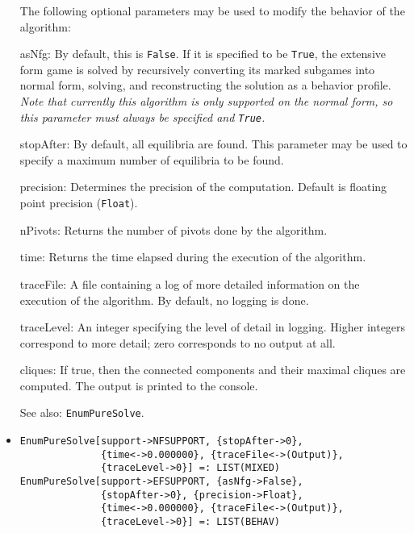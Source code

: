 \begin{itemize}
The following optional parameters may be used to modify the behavior
of the algorithm:
\bd
\item
[asNfg:] By default, this is \verb+False+.  If it is specified to be
\verb+True+, the extensive form game is solved by recursively converting
its marked subgames into normal form, solving, and reconstructing the
solution as a behavior profile.  {\it Note that currently this algorithm
is only supported on the normal form, so this parameter
must always be specified and {\tt True}.} 
\item
[stopAfter:] By default, all equilibria are found.  This parameter may
be used to specify a maximum number of equilibria to be found.
\item
[precision:] Determines the precision of the computation. Default is
floating point precision (\verb+Float+). 
\item
[nPivots:] Returns the number of pivots done by the
algorithm.
\item
[time:] Returns the time elapsed during the execution
of the algorithm.
\item
[traceFile:] A file containing a log of more detailed information on the
execution of the algorithm.  By default, no logging is done.
\item
[traceLevel:] An integer specifying the level of detail in logging.
Higher integers correspond to more detail; zero corresponds to no output
at all.
\item
[cliques:] If true, then the connected components and their maximal
cliques are computed.  The output is printed to the console.
\ed
\item [See also:] \verb+EnumPureSolve+.
\ed

\item{}
\protect \large \begin{verbatim}
EnumPureSolve[support->NFSUPPORT, {stopAfter->0}, 
              {time<->0.000000}, {traceFile<->(Output)},
              {traceLevel->0}] =: LIST(MIXED) 
EnumPureSolve[support->EFSUPPORT, {asNfg->False}, 
              {stopAfter->0}, {precision->Float}, 
              {time<->0.000000}, {traceFile<->(Output)}, 
              {traceLevel->0}] =: LIST(BEHAV) 
\end{verbatim}\normalsize


\end{itemize}

